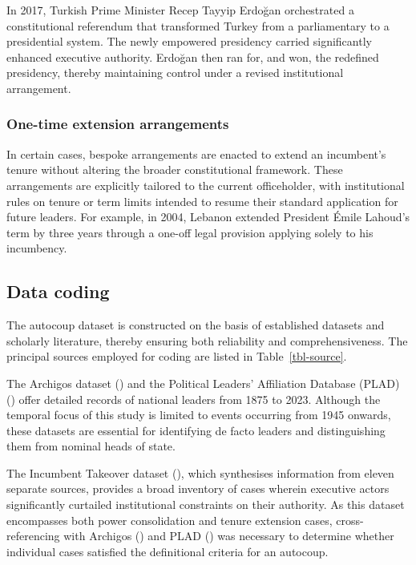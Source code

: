 \documentclass[
  12pt,
]{report}
\begin{document}
In 2017, Turkish Prime Minister Recep Tayyip Erdoğan orchestrated a
constitutional referendum that transformed Turkey from a parliamentary
to a presidential system. The newly empowered presidency carried
significantly enhanced executive authority. Erdoğan then ran for, and
won, the redefined presidency, thereby maintaining control under a
revised institutional arrangement.

\subsubsection*{One-time extension
arrangements}\label{one-time-extension-arrangements}

In certain cases, bespoke arrangements are enacted to extend an
incumbent's tenure without altering the broader constitutional
framework. These arrangements are explicitly tailored to the current
officeholder, with institutional rules on tenure or term limits intended
to resume their standard application for future leaders. For example, in
2004, Lebanon extended President Émile Lahoud's term by three years
through a one-off legal provision applying solely to his incumbency.

\subsection*{Data coding}\label{data-coding}

The autocoup dataset is constructed on the basis of established datasets
and scholarly literature, thereby ensuring both reliability and
comprehensiveness. The principal sources employed for coding are listed
in Table~\ref{tbl-source}.

The Archigos dataset () and the Political Leaders' Affiliation Database (PLAD)
() offer
detailed records of national leaders from 1875 to 2023. Although the
temporal focus of this study is limited to events occurring from 1945
onwards, these datasets are essential for identifying de facto leaders
and distinguishing them from nominal heads of state.

The Incumbent Takeover dataset (), which synthesises information from eleven separate
sources, provides a broad inventory of cases wherein executive actors
significantly curtailed institutional constraints on their authority. As
this dataset encompasses both power consolidation and tenure extension
cases, cross-referencing with Archigos
() and
PLAD () was
necessary to determine whether individual cases satisfied the
definitional criteria for an autocoup.
\end{document}
